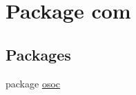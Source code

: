 \hypertarget{namespacecom}{}\section{Package com}
\label{namespacecom}
\subsection*{Packages}
\begin{DoxyCompactItemize}
\item 
package \mbox{\hyperlink{namespacecom_1_1osoc}{osoc}}
\end{DoxyCompactItemize}
